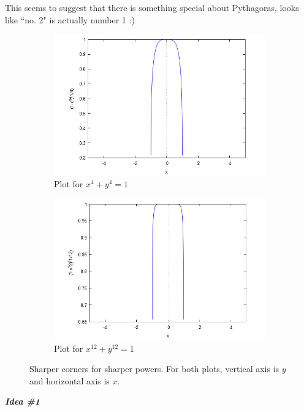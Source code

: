 \documentclass[aps,preprint,preprintnumbers,nofootinbib,showpacs,prd]{revtex4-1}
\begin{document}
This seems to suggest that there is something special about Pythagoras, looks like ``no. 2" is actually number 1 :)
%
\begin{figure}
\centering
\begin{subfigure}{.5\textwidth}
  \centering
  \includegraphics[width=1.1\linewidth]{FLT_n_4.png}
  \caption{Plot for $x^4 + y^4 = 1$}
  \label{fig:n_4}
\end{subfigure}%
\begin{subfigure}{.5\textwidth}
  \centering
  \includegraphics[width=1.1\linewidth]{FLT_n_12.png}
  \caption{Plot for $x^{12} + y^{12} = 1$}
  \label{fig:n_12}
\end{subfigure}
\caption{Sharper corners for sharper powers. For both plots, vertical axis is $y$ and horizontal axis is $x$.}
\label{fig:FLT_n_even}
\end{figure}
%

\bigskip\textbf{\textit{Idea \#1}}
\end{document}
